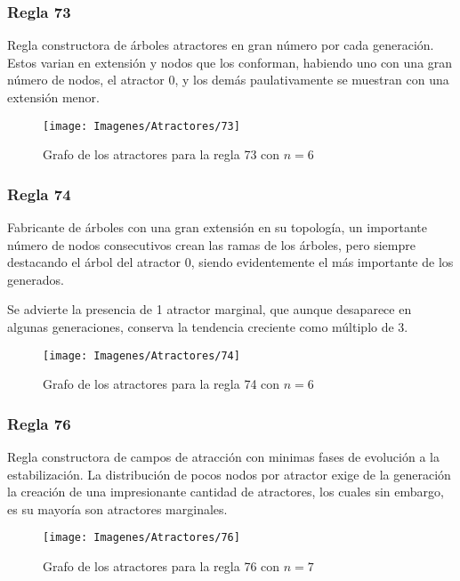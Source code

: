 \documentclass[]{article}
\begin{document}
			\newpage
			\subsubsection{Regla 73}
				\justifying
				Regla constructora de árboles atractores en gran número por cada generación. Estos varian en extensión y nodos que los conforman, habiendo uno con una gran número de nodos, el atractor 0, y los demás paulativamente se muestran con una extensión menor.
				
				\hfill\break
				\hfill\break
				\begin{figure}[!h]
					\centering
					\texttt{[image: Imagenes/Atractores/73]}
					\caption{Grafo de los atractores para la regla 73 con $n=6$}
					\label{Regla_73}
				\end{figure}
			
			\newpage
			\subsubsection{Regla 74}
				\justifying
				Fabricante de árboles con una gran extensión en su topología, un importante número de nodos consecutivos crean las ramas de los árboles, pero siempre destacando el árbol del atractor 0, siendo evidentemente el más importante de los generados.
				
				\hfill\break
				\justifying
				Se advierte la presencia de 1 atractor marginal, que aunque desaparece en algunas generaciones, conserva la tendencia creciente como múltiplo de 3.
				
				\hfill\break
				\hfill\break
				\begin{figure}[!h]
					\centering
					\texttt{[image: Imagenes/Atractores/74]}
					\caption{Grafo de los atractores para la regla 74 con $n=6$}
					\label{Regla_74}
				\end{figure}
			
			\newpage
			\subsubsection{Regla 76}
				\justifying
				Regla constructora de campos de atracción con minimas fases de evolución a la estabilización. La distribución de pocos nodos por atractor exige de la generación la creación de una impresionante cantidad de atractores, los cuales sin embargo, es su mayoría son atractores marginales.
				
				\hfill\break
				\hfill\break
				\begin{figure}[!h]
					\centering
					\texttt{[image: Imagenes/Atractores/76]}
					\caption{Grafo de los atractores para la regla 76 con $n=7$}
					\label{Regla_76}
				\end{figure}
				
\end{document}
